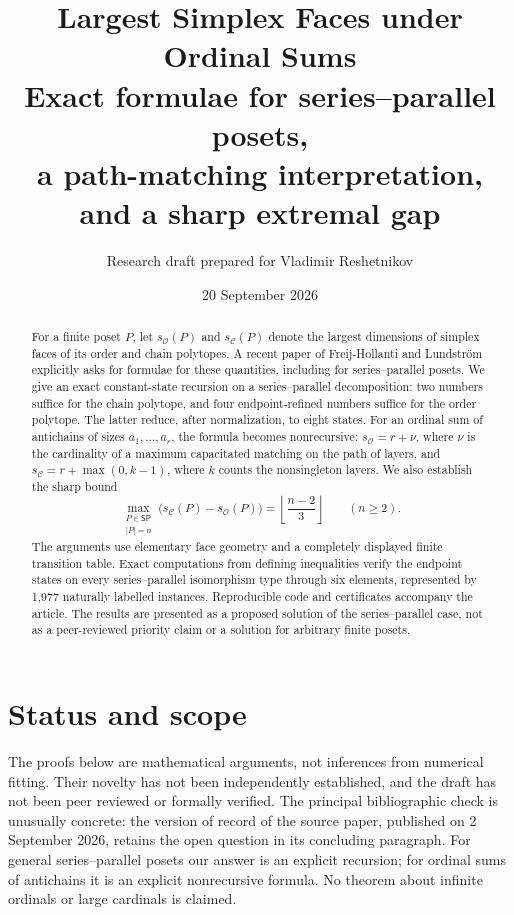 \documentclass[11pt]{article}
\title{\textbf{Largest Simplex Faces under Ordinal Sums}\\[0.45em]
\large Exact formulae for series--parallel posets,\\a path-matching interpretation, and a sharp extremal gap}
\author{Research draft prepared for Vladimir Reshetnikov}
\date{20 September 2026}
\theoremstyle{definition}
\newcommand{\OO}{\mathcal O}
\newcommand{\CC}{\mathcal C}
\newcommand{\sO}{s_{\OO}}
\newcommand{\sC}{s_{\CC}}
\newcommand{\SP}{\mathsf{SP}}
\begin{document}
\maketitle
\begin{abstract}
For a finite poset $P$, let $\sO(P)$ and $\sC(P)$ denote the largest dimensions of simplex faces of its order and chain polytopes. A recent paper of Freij-Hollanti and Lundstr\"om explicitly asks for formulae for these quantities, including for series--parallel posets. We give an exact constant-state recursion on a series--parallel decomposition: two numbers suffice for the chain polytope, and four endpoint-refined numbers suffice for the order polytope. The latter reduce, after normalization, to eight states. For an ordinal sum of antichains of sizes $a_1,\ldots,a_r$, the formula becomes nonrecursive: $\sO=r+\nu$, where $\nu$ is the cardinality of a maximum capacitated matching on the path of layers, and $\sC=r+\max(0,k-1)$, where $k$ counts the nonsingleton layers. We also establish the sharp bound
\[
\max_{\substack{P\in\SP\\|P|=n}}
\bigl(\sC(P)-\sO(P)\bigr)
=\left\lfloor\frac{n-2}{3}\right\rfloor\qquad(n\ge2).
\]
The arguments use elementary face geometry and a completely displayed finite transition table. Exact computations from defining inequalities verify the endpoint states on every series--parallel isomorphism type through six elements, represented by 1,977 naturally labelled instances. Reproducible code and certificates accompany the article. The results are presented as a proposed solution of the series--parallel case, not as a peer-reviewed priority claim or a solution for arbitrary finite posets.
\end{abstract}

\section*{Status and scope}
The proofs below are mathematical arguments, not inferences from numerical fitting. Their novelty has not been independently established, and the draft has not been peer reviewed or formally verified. The principal bibliographic check is unusually concrete: the version of record of the source paper, published on 2 September 2026, retains the open question in its concluding paragraph. For general series--parallel posets our answer is an explicit recursion; for ordinal sums of antichains it is an explicit nonrecursive formula. No theorem about infinite ordinals or large cardinals is claimed.
\end{document}
